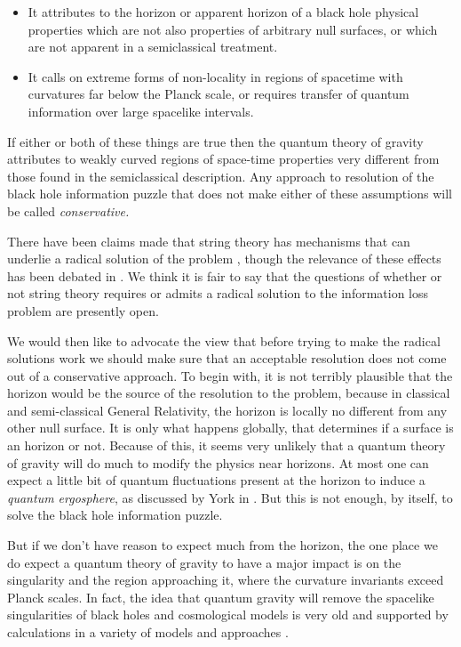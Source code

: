 \documentclass[12pt]{article}
\begin{document}
\begin{itemize}

\item{} It attributes to the horizon or apparent horizon of a black hole physical properties which are not also properties of arbitrary 
null surfaces, or which are not apparent in a semiclassical treatment.  

\item{} It calls on extreme forms of non-locality in regions of spacetime with curvatures far below the Planck scale, or requires 
 transfer of quantum information over large spacelike intervals.  

\end{itemize}

If either or both of these things are true then the  quantum theory of
gravity attributes to weakly curved regions of space-time properties very different from those found in the semiclassical
description.  Any approach to resolution of the black hole information puzzle that does not make either of these assumptions will be called
{\it conservative.} 

There have been claims made that string theory has mechanisms that can underlie a radical solution of the problem \cite{BHC}, though the relevance
of these effects has been debated in \cite{ABHC}. We think it is fair to say that the questions of  whether or not string theory requires or admits
a radical solution to the information loss problem are presently open.  


We would then like to advocate the view that before trying to make the radical solutions work we should make sure that an acceptable 
resolution does not come out of a conservative approach.   To begin with, it is not terribly plausible that the horizon would  
be the source of the 
resolution to the problem, because in classical and semi-classical General Relativity, the horizon is locally no different from any
other null surface.  It is only what happens globally, that determines if a surface is an horizon or not.  Because of this, it seems very unlikely that a quantum theory of gravity will do much to modify the physics near horizons.  At most one can expect a little bit of quantum
fluctuations present at the horizon to induce a {\it quantum ergosphere}, as discussed by York in \cite{york}.  But this is not enough,
by itself, to solve the black hole information puzzle.

But if we don't have reason to expect much from the horizon, the one place we do expect a quantum theory of gravity to have a major impact is on the singularity and the region approaching it, where the curvature invariants exceed Planck scales.  In fact, the idea that quantum gravity will remove the spacelike singularities of black holes and cosmological models is very old and supported by calculations in a variety of models and approaches \cite{ Frolov:1988vj,Frolov:1989pf,sing-go}.
\end{document}
